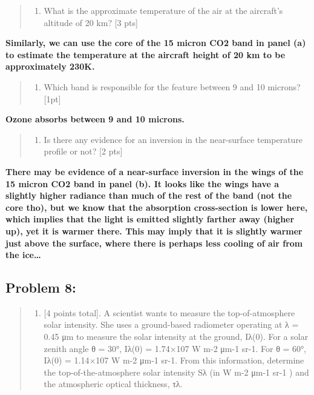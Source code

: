 \documentclass[11pt]{article}
\providecommand{\tightlist}{%
      \setlength{\itemsep}{0pt}\setlength{\parskip}{0pt}}
\begin{document}
\begin{quote}
\begin{enumerate}
\def\labelenumi{(\alph{enumi})}
\setcounter{enumi}{2}
\tightlist
\item
  What is the approximate temperature of the air at the aircraft's
  altitude of 20 km? {[}3 pts{]}
\end{enumerate}
\end{quote}

\textbf{Similarly, we can use the core of the 15 micron CO2 band in
panel (a) to estimate the temperature at the aircraft height of 20 km to
be approximately 230K.}

\begin{quote}
\begin{enumerate}
\def\labelenumi{(\alph{enumi})}
\setcounter{enumi}{3}
\tightlist
\item
  Which band is responsible for the feature between 9 and 10 microns?
  {[}1pt{]}
\end{enumerate}
\end{quote}

\textbf{Ozone absorbs between 9 and 10 microns.}

\begin{quote}
\begin{enumerate}
\def\labelenumi{(\alph{enumi})}
\setcounter{enumi}{4}
\tightlist
\item
  Is there any evidence for an inversion in the near-surface temperature
  profile or not? {[}2 pts{]}
\end{enumerate}
\end{quote}

\textbf{There may be evidence of a near-surface inversion in the wings
of the 15 micron CO2 band in panel (b). It looks like the wings have a
slightly higher radiance than much of the rest of the band (not the core
tho), but we know that the absorption cross-section is lower here, which
implies that the light is emitted slightly farther away (higher up), yet
it is warmer there. This may imply that it is slightly warmer just above
the surface, where there is perhaps less cooling of air from the
ice\ldots{}}

\subsection{Problem 8:}\label{problem-8}

\begin{quote}
\begin{enumerate}
\def\labelenumi{\arabic{enumi})}
\setcounter{enumi}{7}
\tightlist
\item
  {[}4 points total{]}. A scientist wants to measure the
  top-of-atmosphere solar intensity. She uses a ground-based radiometer
  operating at λ = 0.45 μm to measure the solar intensity at the ground,
  Iλ(0). For a solar zenith angle θ = 30°, Iλ(0) = 1.74×107 W m-2 μm-1
  sr-1. For θ = 60°, Iλ(0) = 1.14×107 W m-2 μm-1 sr-1. From this
  information, determine the top-of-the-atmosphere solar intensity Sλ
  (in W m-2 μm-1 sr-1 ) and the atmospheric optical thickness, τλ.
\end{enumerate}
\end{quote}
\end{document}
